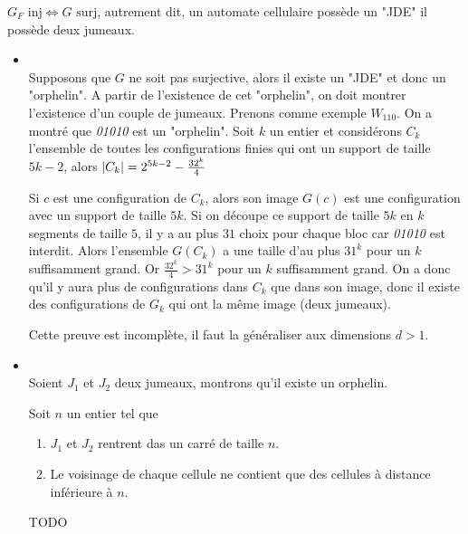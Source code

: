 \begin{theorem}
	$G_F \text{ inj} \iff G \text{ surj}$, autrement dit, un automate cellulaire possède un "JDE" \ssi il possède deux jumeaux.
\end{theorem}



\begin{proofI}
	\begin{itemize}
		\item \bimpLR\\
		      Supposons que $G$ ne soit pas surjective, alors il existe un "JDE" et donc un "orphelin".
		      A partir de l'existence de cet "orphelin", on doit montrer l'existence d'un couple de jumeaux.
		      Prenons comme exemple $W_{110}$. On a montré que \emph{01010} est un "orphelin". Soit $k$ un entier
		      et considérons $C_k$ l'ensemble de toutes les configurations finies qui ont un support de taille
		      $5k-2$, alors $\left|C_k\right| = 2^{5k-2} - \frac {32^k} 4$

		      Si $c$ est une configuration de $C_k$, alors son image $G(c)$ est une configuration avec un support de taille $5k$.
		      Si on découpe ce support de taille $5k$ en $k$ segments de taille $5$, il y a au plus $31$ choix pour chaque bloc car
		      \emph{01010} est interdit. Alors l'ensemble $G(C_k)$ a une taille d'au plus $31^k$ pour un $k$ suffisamment grand.
		      Or $\frac {32^k} 4 > 31 ^ k$ pour un $k$ suffisamment grand. On a donc qu'il y aura plus de configurations
		      dans $C_k$ que dans son image, donc il existe des configurations de $G_k$ qui ont la même image (deux jumeaux).

		      Cette preuve est incomplète, il faut la généraliser aux dimensions $d > 1$.


		\item \bimpRL\\
		      Soient $J_1$ et $J_2$ deux jumeaux, montrons qu'il existe un orphelin.

		      Soit $n$ un entier tel que
		      \begin{enumerate}
			      \item $J_1$ et $J_2$ rentrent das un carré de taille $n$.
			      \item Le voisinage de chaque cellule ne contient que des cellules à distance inférieure à $n$.
		      \end{enumerate}
              TODO
	\end{itemize}
\end{proofI}

